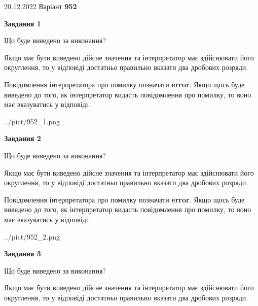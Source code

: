 \documentclass[12pt, ukrainian]{article}
\begin{document}
{20.12.2022 Варіант \No \textbf { 952 }\par}
{
\begin {Large}

{\begin {center}\textbf{Завдання 1}\end {center}}\par
Що буде виведено за виконання? \par

Якщо має бути виведено дійсне значення та інтерпретатор має здійснювати його округлення, 
то у відповіді достатньо правильно вказати два дробових розряди.

Повідомлення інтерпретатора про помилку позначати \textbf{error}.
Якщо щось буде виведено до того, як інтерпретатор видасть повідомлення про помилку, 
то воно має вказуватись у відповіді. \par

\begin{center}
	{../pict/952_1.png}
\end{center}
\newpage

{\begin {center}\textbf{Завдання 2}\end {center}}\par
Що буде виведено за виконання? \par

Якщо має бути виведено дійсне значення та інтерпретатор має здійснювати його округлення, 
то у відповіді достатньо правильно вказати два дробових розряди.

Повідомлення інтерпретатора про помилку позначати \textbf{error}.
Якщо щось буде виведено до того, як інтерпретатор видасть повідомлення про помилку, 
то воно має вказуватись у відповіді. \par

\begin{center}
	{../pict/952_2.png}
\end{center}
\newpage

{\begin {center}\textbf{Завдання 3}\end {center}}\par
Що буде виведено за виконання? \par

Якщо має бути виведено дійсне значення та інтерпретатор має здійснювати його округлення, 
то у відповіді достатньо правильно вказати два дробових розряди.


\end{Large}}
\end{document}
